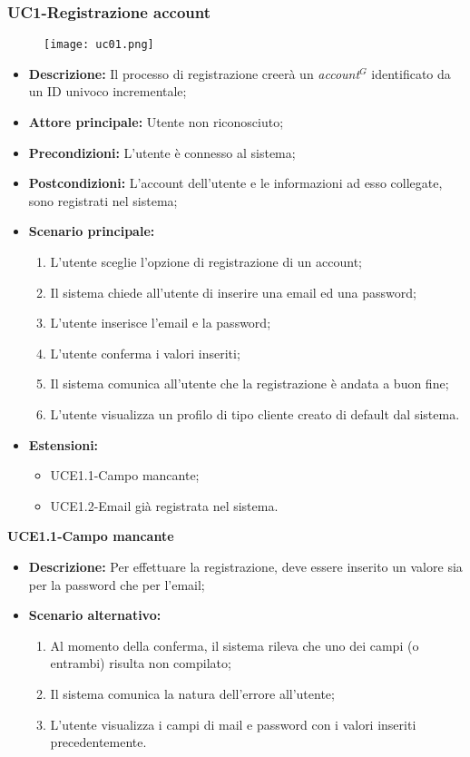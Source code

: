 \nonstopmode
\subsubsection{UC1-Registrazione account}
\begin{figure}[h] \texttt{[image: uc01.png]} \end{figure}
\begin{itemize}
    \item \textbf{Descrizione:} Il processo di registrazione creerà un \emph{account}$^{G}$ identificato da un ID univoco incrementale;
    \item \textbf{Attore principale:} Utente non riconosciuto;
    \item \textbf{Precondizioni:} L'utente è connesso al sistema;
    \item \textbf{Postcondizioni:} L'account dell'utente e le informazioni ad esso collegate, sono registrati nel sistema;
    \item \textbf{Scenario principale:}
        \begin{enumerate}
            \item L'utente sceglie l'opzione di registrazione di un account;
            \item Il sistema chiede all'utente di inserire una email ed una password;
            \item L'utente inserisce l'email e la password;
            \item L'utente conferma i valori inseriti;
            \item Il sistema comunica all'utente che la registrazione è andata a buon fine;
            \item L'utente visualizza un profilo di tipo cliente creato di default dal sistema.
        \end{enumerate}
    \item \textbf{Estensioni:}
        \begin{itemize}
                \item UCE1.1-Campo mancante;
                \item UCE1.2-Email già registrata nel sistema.
        \end{itemize}
\end{itemize}

\textbf{UCE1.1-Campo mancante}
\begin{itemize}
    \item \textbf{Descrizione:} Per effettuare la registrazione, deve essere inserito un valore sia per la password che per l'email;
    \item \textbf{Scenario alternativo:}
    \begin{enumerate}
        \item Al momento della conferma, il sistema rileva che uno dei campi (o entrambi) risulta non compilato;
        \item Il sistema comunica la natura dell'errore all'utente;
        \item L'utente visualizza i campi di mail e password con i valori inseriti precedentemente.
    \end{enumerate}
\end{itemize}

